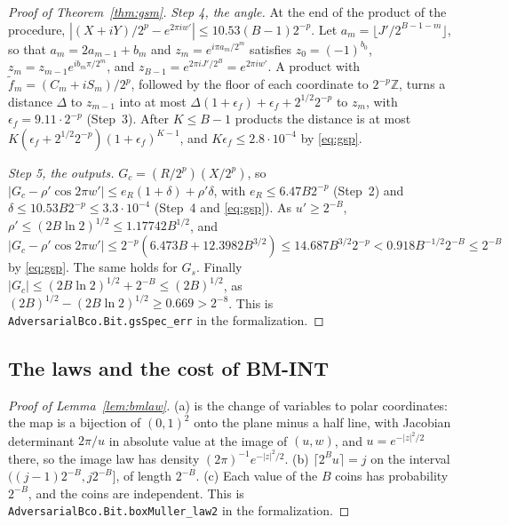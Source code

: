 \documentclass[11pt]{amsart}
\theoremstyle{definition}
\numberwithin{equation}{section}
\begin{document}
\begin{proof}[Proof of Theorem~\ref{thm:gsm}]
\emph{Step 4, the angle.} At the end of the product of the procedure, $|(X+iY)/2^p-e^{2\pi iw'}|\le10.53(B-1)2^{-p}$.
Let $a_m=\lfloor J'/2^{B-1-m}\rfloor$, so that $a_m=2a_{m-1}+b_m$ and $z_m=e^{i\pi a_m/2^m}$ satisfies $z_0=(-1)^{b_0}$, $z_m=z_{m-1}e^{ib_m\pi/2^m}$, and $z_{B-1}=e^{2\pi iJ'/2^B}=e^{2\pi iw'}$. A product with $\tilde f_m=(C_m+iS_m)/2^p$, followed by the floor of each coordinate to $2^{-p}\mathbb Z$, turns a distance $\Delta$ to $z_{m-1}$ into at most $\Delta(1+\epsilon_f)+\epsilon_f+2^{1/2}2^{-p}$ to $z_m$, with $\epsilon_f=9.11\cdot2^{-p}$ (Step~3). After $K\le B-1$ products the distance is at most $K(\epsilon_f+2^{1/2}2^{-p})(1+\epsilon_f)^{K-1}$, and $K\epsilon_f\le2.8\cdot10^{-4}$ by \eqref{eq:gsp}.

\emph{Step 5, the outputs.} $G_c=(R/2^p)(X/2^p)$, so $|G_c-\rho'\cos2\pi w'|\le e_R(1+\delta)+\rho'\delta$, with $e_R\le6.47B2^{-p}$ (Step~2) and $\delta\le10.53B2^{-p}\le3.3\cdot10^{-4}$ (Step~4 and \eqref{eq:gsp}). As $u'\ge2^{-B}$, $\rho'\le(2B\ln2)^{1/2}\le1.17742B^{1/2}$, and
\[
|G_c-\rho'\cos2\pi w'|\le2^{-p}(6.473B+12.3982B^{3/2})\le14.687B^{3/2}2^{-p}<0.918B^{-1/2}2^{-B}\le2^{-B}
\]
by \eqref{eq:gsp}. The same holds for $G_s$. Finally $|G_c|\le(2B\ln2)^{1/2}+2^{-B}\le(2B)^{1/2}$, as $(2B)^{1/2}-(2B\ln2)^{1/2}\ge0.669>2^{-8}$.
This is \texttt{AdversarialBco.Bit.gsSpec\_err} in the formalization.
\end{proof}

\subsection{The laws and the cost of BM-INT}

\begin{proof}[Proof of Lemma~\ref{lem:bmlaw}]
(a) is the change of variables to polar coordinates: the map is a bijection of $(0,1)^2$ onto the plane minus a half line, with Jacobian determinant $2\pi/u$ in absolute value at the image of $(u,w)$, and $u=e^{-|z|^2/2}$ there, so the image law has density $(2\pi)^{-1}e^{-|z|^2/2}$. (b) $\lceil2^Bu\rceil=j$ on the interval $((j-1)2^{-B},j2^{-B}]$, of length $2^{-B}$. (c) Each value of the $B$ coins has probability $2^{-B}$, and the coins are independent.
This is \texttt{AdversarialBco.Bit.boxMuller\_law2} in the formalization.
\end{proof}
\end{document}
